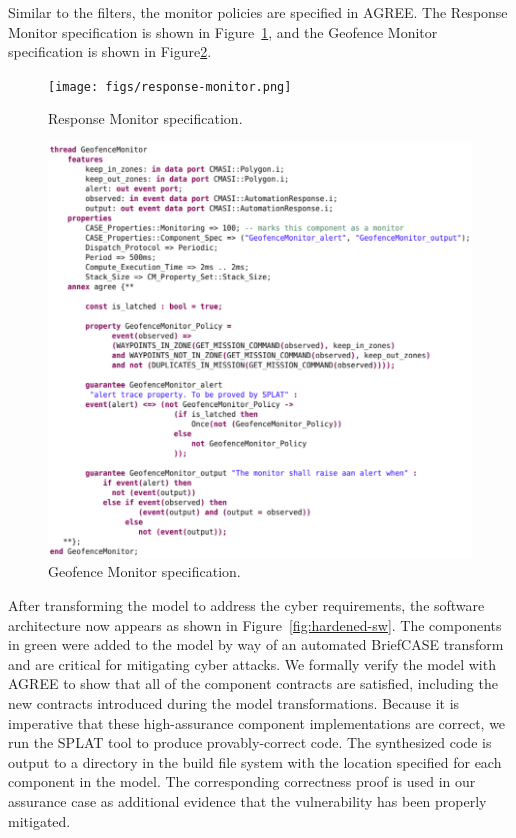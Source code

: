 Similar to the filters, the monitor policies are specified in AGREE. The Response Monitor specification is shown in Figure~\ref{fig:response-monitor}, and the Geofence Monitor specification is shown in Figure\ref{fig:geofence-monitor}. 

\begin{figure}[h]
	\centering
	\texttt{[image: figs/response-monitor.png]}
	\caption{Response Monitor specification.} 
	\label{fig:response-monitor} 
\end{figure}

\begin{figure}[h]
	\centering
	\includegraphics[width=1\columnwidth]{figs/geofence-monitor.png}
	\caption{Geofence Monitor specification.} 
	\label{fig:geofence-monitor} 
\end{figure}


After transforming the model to address the cyber requirements, the software architecture now appears as shown in Figure~\ref{fig:hardened-sw}.  The components in green were added to the model by way of an automated BriefCASE transform and are critical for mitigating cyber attacks. 
We formally verify the model with AGREE to show that all of the component contracts are satisfied, including the new contracts introduced during the model transformations.
Because it is imperative that these high-assurance component implementations are correct,
we run the SPLAT tool to produce provably-correct code.  
The synthesized code is output to a directory in the build file system with the location specified for each component in the model.  The corresponding correctness proof is used in our assurance case as additional evidence that the vulnerability has been properly mitigated.

